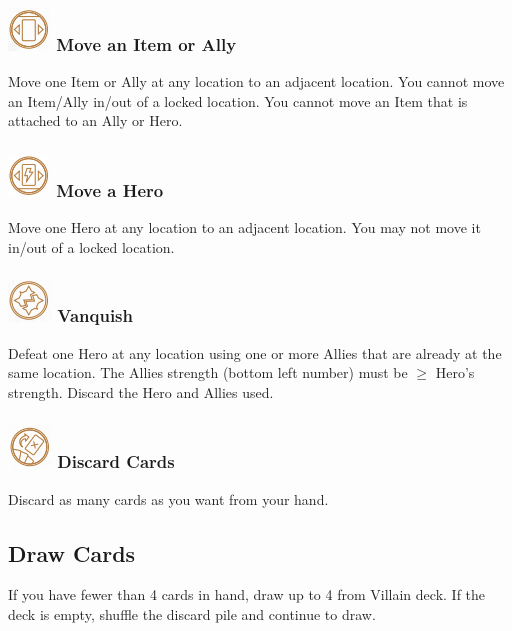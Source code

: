 \documentclass[12pt]{article}
\begin{document}
\begin{mdframed}[style = customFrame]
\begin{multicols*}{2}
    \subsubsection*{\includegraphics[scale=0.40]{images/MoveItemOrAlly.png}\hspace{0.1em} Move an Item or Ally}
    Move one Item or Ally at any location to an adjacent location. You cannot move an Item/Ally in/out of a locked location. You cannot move an Item that is attached to an Ally or Hero.

    \subsubsection*{\includegraphics[scale=0.40]{images/MoveHero.png}\hspace{0.1em} Move a Hero}
    Move one Hero at any location to an adjacent location. You may not move it in/out of a locked location.

    \subsubsection*{\includegraphics[scale=0.40]{images/Vanquish.png}\hspace{0.1em} Vanquish}
    Defeat one Hero at any location using one or more Allies that are already at the same location. The Allies strength (bottom left number) must be $\geq$ Hero's strength. Discard the Hero and Allies used.

    \subsubsection*{\includegraphics[scale=0.40]{images/DiscardCards.png}\hspace{0.1em} Discard Cards}
    Discard as many cards as you want from your hand.

\subsection*{Draw Cards}
If you have fewer than 4 cards in hand, draw up to 4 from Villain deck. If the deck is empty, shuffle the discard pile and continue to draw.

\end{multicols*}
\end{mdframed}
\end{document}
